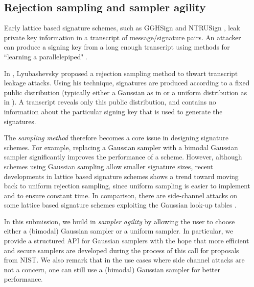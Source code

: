 \documentclass{llncs}
\newcommand{\<}{\langle}
\renewcommand{\>}{\rangle}
\begin{document}
\subsection{Rejection sampling and sampler agility}
Early lattice based signature schemes, such as GGHSign \cite{DBLP:conf/crypto/GoldreichGH97a} and NTRUSign \cite{DBLP:conf/ctrsa/HoffsteinHPSW03}, leak private key information in a transcript of message/signature pairs. An attacker can produce a signing key from a long enough transcript using methods for ``learning a parallelepiped" \cite{DBLP:journals/joc/NguyenR09,DBLP:conf/asiacrypt/DucasN12a}.

In \cite{lyu09}, Lyubashevsky proposed a rejection sampling method to thwart transcript leakage attacks. Using his technique, signatures are produced according to a fixed public distribution (typically either a Gaussian as in \cite{lyu09} or a uniform distribution as in \cite{DBLP:conf/pqcrypto/HoffsteinPSSW14}). A transcript reveals only this public distribution, and contains no information about the particular signing key that is used to generate the signatures. 


The {\em sampling method} therefore becomes a core issue in designing signature schemes.
For example, replacing a Gaussian sampler with a bimodal Gaussian sampler \cite{DBLP:conf/crypto/DucasDLL13} significantly improves the performance of a scheme.
However, although schemes using Gaussian sampling allow smaller signature sizes, recent developments in lattice based signature schemes \cite{DBLP:journals/iacr/DucasLLSSS17} shows a trend toward moving back
to uniform rejection sampling, since uniform sampling is easier to implement and to 
ensure constant time.  
In comparison, there are side-channel attacks on some lattice based
signature schemes exploiting the Gaussian look-up tables \cite{DBLP:conf/ches/BruinderinkHLY16}.

In this submission, we 
build in {\em sampler agility} by 
allowing the user to choose either a 
(bimodal) Gaussian sampler or a uniform sampler.
In particular, we provide a structured API for Gaussian samplers
with the hope that more efficient and secure samplers 
are developed during the process of this call for proposals
from NIST. We also remark that in the use cases where side channel
attacks are not a concern, one can still use a (bimodal) Gaussian sampler for better performance.
 
\end{document}
